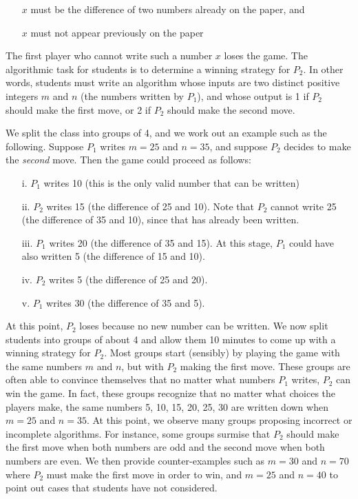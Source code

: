 \begin{multicols}{2}
{\begin{itemize}
\item[\bullet] $x$ must be the difference of two numbers already on the paper, and

\item[\bullet] $x$ must not appear previously on the paper
\end{itemize} 

The first player who cannot write such a number $x$ loses the game. The algorithmic task for students is to determine a winning strategy for $P_{2}$. In other words, students must write an algorithm whose inputs are two distinct positive integers $m$ and $n$ (the numbers written by $P_{1}$), and whose output is 1 if $P_{2}$ should make the first move, or 2 if $P_{2}$ should make the second move.

We split the class into groups of 4, and we work out an example such as the following. Suppose $P_{1}$ writes $m = 25$ and $n = 35$, and suppose $P_{2}$ decides to make the \textit{second} move. Then the game could proceed as follows:
\begin{itemize}
\item[i.] $P_{1}$ writes 10 (this is the only valid number that can be written)
\item[ii.] $P_{2}$ writes 15 (the difference of 25 and 10). Note that $P_{2}$ cannot write 25 (the difference of 35 and 10), since that has already been written.
\item[iii.] $P_{1}$ writes 20 (the difference of 35 and 15). At this stage, $P_{1}$ could have also written 5 (the difference of 15 and 10).
\item[iv.] $P_{2}$ writes 5 (the difference of 25 and 20).
\item[v.] $P_{1}$ writes 30 (the difference of 35 and 5).
\end{itemize}

At this point, $P_{2}$ loses because no new number can be written. We now split students into groups of about 4 and allow them 10 minutes to come up with a winning strategy for $P_{2}$. Most groups start (sensibly) by playing the game with the same numbers $m$ and $n$, but with $P_{2}$ making the first move. These groups are often able to convince themselves that no matter what numbers $P_{1}$ writes, $P_{2}$ can win the game. In fact, these groups recognize that no matter what choices the players make, the same numbers 5, 10, 15, 20, 25, 30 are written down when $m = 25$ and $n = 35$. At this point, we observe many groups proposing incorrect or incomplete algorithms. For instance, some groups surmise that $P_{2}$ should make the first move when both numbers are odd and the second move when both numbers are even. We then provide counter-examples such as $m = 30$ and $n = 70$ where $P_{2}$ must make the first move in order to win, and $m = 25$ and $n = 40$ to point out cases that students have not considered.


}
\end{multicols}
